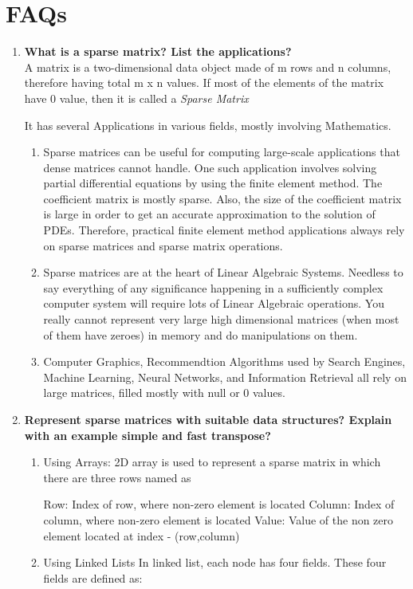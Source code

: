 \documentclass[11pt]{article}
\begin{document}
\section{FAQs}
\begin{enumerate}
	\item \textbf{What is a sparse matrix? List the applications?}\\
	      A matrix is a two-dimensional data object made of m rows and n columns, therefore having total m x n values. If most of the elements of the matrix have 0 value, then it is called a \textit{Sparse Matrix}

	      It has several Applications in various fields, mostly involving Mathematics.
	      \begin{enumerate}
		      \item Sparse matrices can be useful for computing large-scale applications that dense matrices cannot handle. One such application involves solving partial differential equations by using the finite element method. The coefficient matrix is mostly sparse. Also, the size of the coefficient matrix is large in order to get an accurate approximation to the solution of PDEs. Therefore, practical finite element method applications always rely on sparse matrices and sparse matrix operations.
		      \item Sparse matrices are at the heart of Linear Algebraic Systems. Needless to say everything of any significance happening in a sufficiently complex computer system will require lots of Linear Algebraic operations. You really cannot represent very large high dimensional matrices (when most of them have zeroes) in memory and do manipulations on them.
		      \item Computer Graphics, Recommendtion Algorithms used by Search Engines, Machine Learning, Neural Networks, and Information Retrieval all rely on large matrices, filled mostly with null or 0 values.
	      \end{enumerate}
	\item \textbf{Represent sparse matrices with suitable data structures? Explain with an example simple and fast transpose?}\\
	      \begin{enumerate}
		      \item Using Arrays:
		            2D array is used to represent a sparse matrix in which there are three rows named as

		            Row: Index of row, where non-zero element is located
		            Column: Index of column, where non-zero element is located
		            Value: Value of the non zero element located at index - (row,column)
		      \item Using Linked Lists
		            In linked list, each node has four fields. These four fields are defined as:


\end{enumerate}
\end{enumerate}
\end{document}
